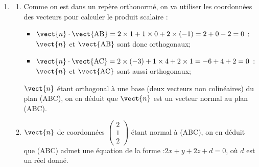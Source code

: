 \begin{enumerate}
\begin{enumerate}
		On remarque que l'on a :\quad $\vect{\mathrm{CD}} = 4\times \vect{\mathrm{AB}} + 0\times \vect{\mathrm{AC}}$.

		Le vecteur $\vect{\mathrm{CD}}$ peut donc être écrit comme combinaison linéaire des vecteurs $\vect{\mathrm{AB}}$ et $\vect{\mathrm{AC}}$, donc c'est un vecteur du plan (ABC), et puisque C est dans le plan (ABC), on en déduit que D est également dans (ABC).

		Finalement, puisque D est dans (ABC), les quatre points A, B, C et D sont bien coplanaires.

		\item À la question précédente, on a établi $\vect{\mathrm{CD}} = 4\times \vect{\mathrm{AB}} + 0\times \vect{\mathrm{AC}}$, c'est-à-dire $\vect{\mathrm{CD}} = 4\times \vect{\mathrm{AB}}$. Les vecteurs $\vect{\mathrm{AB}}$ et $\vect{\mathrm{CD}}$ étant colinéaires, les segments [AB] et [CD] sont portés par des droites parallèles (strictement, car C n'est pas aligné avec A et B).

		ABCD est donc une figure plane (les quatre points étant coplanaires), c'est donc un quadrilatère, non croisé (puisque $\vect{\mathrm{AB}}$ et $\vect{\mathrm{CD}}$ sont colinéaires de même sens, cela signifie que ABDC est non croisé, ABCD serait un quadrilatère croisé), dont les côtés [AB] et [DC] sont parallèles : le quadrilatère ABDC est donc bien un trapèze, de bases [AB] et [DC].
	\end{enumerate}

\item \begin{enumerate}
	\item Comme on est dans un repère \Oijk{} orthonormé, on va utiliser les coordonnées des vecteurs pour calculer le produit scalaire :
	\begin{itemize}
		\item $\vect{n}\cdot\vect{\mathrm{AB}} = 2\times 1 + 1 \times 0 + 2 \times (-1) = 2 + 0 - 2 = 0$ :\quad $ \vect{n}$ et $\vect{\mathrm{AB}}$ sont donc orthogonaux;
		\item $\vect{n}\cdot\vect{\mathrm{AC}} = 2\times (-3) + 1 \times 4 + 2 \times 1 = -6 + 4 + 2 = 0$ :\quad $ \vect{n}$ et $\vect{\mathrm{AC}}$ sont aussi orthogonaux;
	\end{itemize}

	$\vect{n}$ étant orthogonal à une base (deux vecteurs non colinéaires) du plan (ABC), on en déduit que $\vect{n}$ est un vecteur normal au plan (ABC).

	\item $\vect{n}$ de coordonnées $\begin{pmatrix}2\\1\\2\end{pmatrix}$ étant normal à (ABC), on en déduit que (ABC) admet une équation de la forme :\quad$ 2x + y + 2z + d = 0$, où $d$ est un réel donné.


\end{enumerate}
\end{enumerate}
